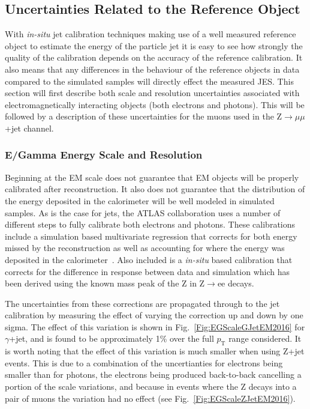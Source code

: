 \subsection{Uncertainties Related to the Reference Object}
With \textit{in-situ} jet calibration techniques making use of a well measured reference object to estimate the energy of the particle jet it is easy to see how strongly the quality of the calibration depends on the accuracy of the reference calibration.  
It also means that any differences in the behaviour of the reference objects in data compared to the simulated samples will directly effect the measured JES.  
This section will first describe both scale and resolution uncertainties associated with electromagnetically interacting objects (both electrons and photons).  
This will be followed by a description of these uncertainties for the muons used in the Z$\rightarrow\mu\mu$+jet channel.  
\subsubsection{E/Gamma Energy Scale and Resolution}

Beginning at the EM scale does not guarantee that EM objects will be properly calibrated after reconstruction.  
It also does not guarantee that the distribution of the energy deposited in the calorimeter will be well modeled in simulated samples.  
As is the case for jets, the ATLAS collaboration uses a number of different steps to fully calibrate both electrons and photons.  
These calibrations include a simulation based multivariate regression that corrects for both energy missed by the reconstruction as well as accounting for where the energy was deposited in the calorimeter~\cite{ATL-PHYS-PUB-2016-015}.  
Also included is a \textit{in-situ} based calibration that corrects for the difference in response between data and simulation which has been derived using the known mass peak of the Z in Z$\rightarrow$ee decays.  

The uncertainties from these corrections are propagated through to the jet calibration by measuring the effect of varying the correction up and down by one sigma.  
The effect of this variation is shown in Fig.~\ref{Fig:EGScaleGJetEM2016} for $\gamma$+jet, and is found to be approximately 1\% over the full $p_{\mathrm T}$ range considered.  
It is worth noting that the effect of this variation is much smaller when using Z+jet events.  
This is due to a combination of the uncertianties for electrons being smaller than for photons, the electrons being produced back-to-back cancelling a portion of the scale variations, and because in events where the Z decays into a pair of muons the variation had no effect (see Fig.~\ref{Fig:EGScaleZJetEM2016}).

